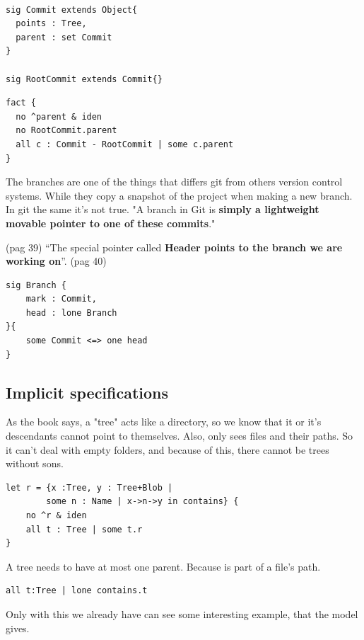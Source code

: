 \begin{lstlisting}

sig Commit extends Object{
  points : Tree,
  parent : set Commit
}

sig RootCommit extends Commit{}

\end{lstlisting}

\begin{lstlisting}
fact {
  no ^parent & iden
  no RootCommit.parent
  all c : Commit - RootCommit | some c.parent	
}

\end{lstlisting}

The branches are one of the things that differs git from 
others version control systems. While they copy a snapshot of the 
project when making a new branch. In git the same it's not true.
"A branch in Git is {\bf simply a 
lightweight movable pointer to one of these commits}." \par \cite{progit} 
(pag 39)
``The special pointer called {\bf Header 
points to the branch we are working on}''. \cite{progit} (pag 40)

\begin{lstlisting}
sig Branch {
	mark : Commit,
	head : lone Branch
}{
	some Commit <=> one head
}
\end{lstlisting}


\subsection{Implicit specifications}

As the book \cite{gitComm} says, a "tree" acts
like a directory, so we know that it or it's 
descendants cannot point to themselves.
Also, only sees files and their paths. So it can't
deal with empty folders, and because of this, there cannot
be trees without sons.
\begin{lstlisting}
let r = {x :Tree, y : Tree+Blob | 
		some n : Name | x->n->y in contains} {
	no ^r & iden
	all t : Tree | some t.r
}
\end{lstlisting}

A tree needs to have at most one parent. Because is part
of a file's path.
\begin{lstlisting}
all t:Tree | lone contains.t
\end{lstlisting} \par

Only with this we already have can see some interesting example, that
the model gives.\par

